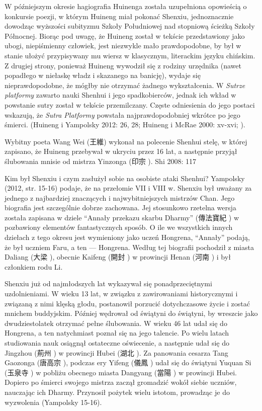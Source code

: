 W późniejszym okresie hagiografia Huinenga została uzupełniona opowieścią o konkursie poezji, w którym Huineng miał pokonać Shenxiu, jednoznacznie dowodząc wyższości subityzmu Szkoły Południowej nad stopniową ścieżką Szkoły Północnej.
Biorąc pod uwagę, że Huineng został w tekście przedstawiony jako ubogi, niepiśmienny człowiek, jest niezwykle mało prawdopodobne, by był w stanie ułożyć przypisywany mu wiersz w klasycznym, literackim języku chińskim.
Z drugiej strony, ponieważ Huineng wywodził się z rodziny urzędnika (nawet popadłego w niełaskę władz i skazanego na banicję), wydaje się nieprawdopodobne, że mógłby nie otrzymać żadnego wykształcenia.
W \textit{Sutrze platformy} zawarto nauki Shenhui i jego spadkobierców, jednak ich wkład w powstanie sutry został w tekście przemilczany.
Częste odniesienia do jego postaci wskazują, że \textit{Sutra Platformy} powstała najprawdopodobniej wkrótce po jego śmierci.
(Huineng i Yampolsky 2012: 26, 28; Huineng i McRae 2000: xv-xvi; ).

Wybitny poeta Wang Wei (王維) wykonał na polecenie Shenhui stelę, w której zapisano, że Huineng przebywał w ukryciu przez 16 lat, a następnie przyjął ślubowania mnisie od mistrza Yinzonga (印宗 ). Shi 2008: 117

Kim był Shenxiu i czym zasłużył sobie na osobiste ataki Shenhui? Yampolsky (2012, str. 15-16) podaje, że na przełomie VII i VIII w. Shenxiu był uważany za jednego z najbardziej znaczących i najwybitniejszych mistrzów Chan.
Jego biografia jest szczególnie dobrze zachowana. Jej stosunkowo rzetelna wersja została zapisana w dziele ``Annały przekazu skarbu Dharmy'' (傳法寶紀 ) w pozbawiony elementów fantastycznych sposób.
O ile we wszystkich innych dziełach z tego okresu jest wymieniony jako uczeń Hongrena, ``Annały'' podają, że był uczniem Faru, a ten --- Hongrena. Według tej biografii pochodził z miasta Daliang (大梁 ), obecnie Kaifeng (開封 ) w prowincji Henan (河南 ) i był członkiem rodu Li.

Shenxiu już od najmłodszych lat wykazywał się ponadprzeciętnymi uzdolnieniami.
W wieku 13 lat, w związku z zawirowaniami historycznymi i związaną z nimi klęską głodu, postanowił porzucić dotychczasowe życie i zostać mnichem buddyjskim.
Później wędrował od świątyni do świątyni, by wreszcie jako dwudziestolatek otrzymać pełne ślubowania.
W wieku 46 lat udał się do Hongrena, a ten natychmiast poznał się na jego talencie.
Po wielu latach studiowania nauk osiągnął ostateczne oświecenie, a następnie udał się do Jingzhou (荊州 ) w prowincji Hubei (湖北 ).
Za panowania cesarza Tang Gaozonga (唐高宗 ), podczas ery Yifeng (儀鳳 ) udał się do świątyni Yuquan Si (玉泉寺 ) w pobliżu obecnego miasta Dangyang (當陽 ) w prowincji Hubei.
Dopiero po śmierci swojego mistrza zaczął gromadzić wokół siebie uczniów, nauczając ich Dharmy. Przynosił pożytek wielu istotom, prowadząc je do wyzwolenia
(Yampolsky 15-16).

